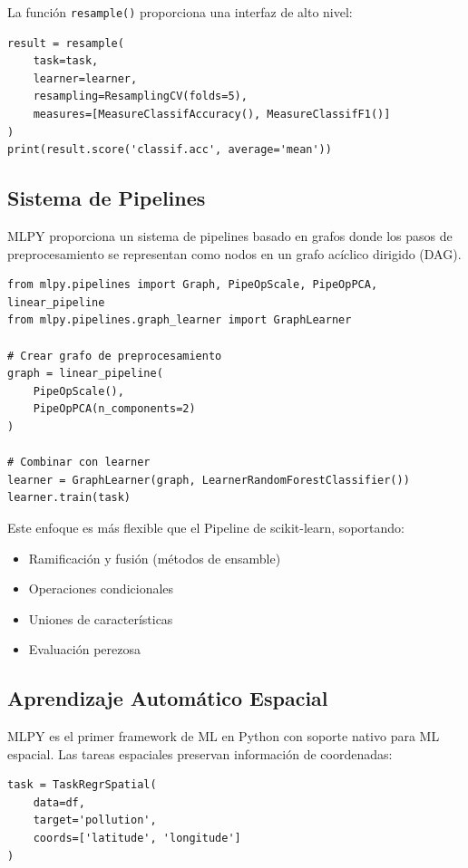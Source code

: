 \documentclass[twoside,11pt]{article}
\begin{document}
La función \texttt{resample()} proporciona una interfaz de alto nivel:

\begin{lstlisting}
result = resample(
    task=task,
    learner=learner,
    resampling=ResamplingCV(folds=5),
    measures=[MeasureClassifAccuracy(), MeasureClassifF1()]
)
print(result.score('classif.acc', average='mean'))
\end{lstlisting}

\subsection{Sistema de Pipelines}

MLPY proporciona un sistema de pipelines basado en grafos donde los pasos de preprocesamiento se representan como nodos en un grafo acíclico dirigido (DAG).

\begin{lstlisting}
from mlpy.pipelines import Graph, PipeOpScale, PipeOpPCA, linear_pipeline
from mlpy.pipelines.graph_learner import GraphLearner

# Crear grafo de preprocesamiento
graph = linear_pipeline(
    PipeOpScale(),
    PipeOpPCA(n_components=2)
)

# Combinar con learner
learner = GraphLearner(graph, LearnerRandomForestClassifier())
learner.train(task)
\end{lstlisting}

Este enfoque es más flexible que el Pipeline de scikit-learn, soportando:
\begin{itemize}
  \item Ramificación y fusión (métodos de ensamble)
  \item Operaciones condicionales
  \item Uniones de características
  \item Evaluación perezosa
\end{itemize}

\subsection{Aprendizaje Automático Espacial}

MLPY es el primer framework de ML en Python con soporte nativo para ML espacial. Las tareas espaciales preservan información de coordenadas:

\begin{lstlisting}
task = TaskRegrSpatial(
    data=df,
    target='pollution',
    coords=['latitude', 'longitude']
)
\end{lstlisting}
\end{document}
